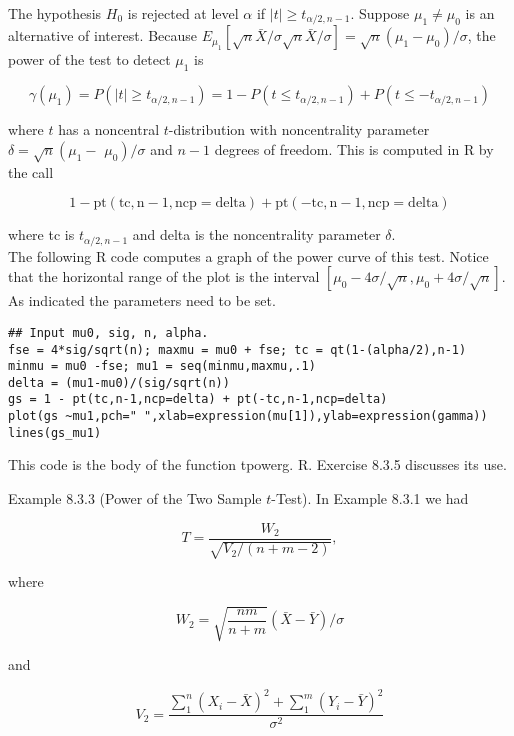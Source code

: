 The hypothesis $H_{0}$ is rejected at level $\alpha$ if $|t| \geq t_{\alpha / 2, n-1}$. Suppose $\mu_{1} \neq \mu_{0}$ is an alternative of interest. Because $E_{\mu_{1}}[\sqrt{n} \bar{X} / \sigma \sqrt{n} \bar{X} / \sigma]=\sqrt{n}\left(\mu_{1}-\mu_{0}\right) / \sigma$, the power of the test to detect $\mu_{1}$ is


\begin{equation*}
\gamma\left(\mu_{1}\right)=P\left(|t| \geq t_{\alpha / 2, n-1}\right)=1-P\left(t \leq t_{\alpha / 2, n-1}\right)+P\left(t \leq-t_{\alpha / 2, n-1}\right) \tag{8.3.5}
\end{equation*}


where $t$ has a noncentral $t$-distribution with noncentrality parameter $\delta=\sqrt{n}\left(\mu_{1}-\right.$ $\left.\mu_{0}\right) / \sigma$ and $n-1$ degrees of freedom. This is computed in R by the call

$$
1-\mathrm{pt}(\mathrm{tc}, \mathrm{n}-1, \mathrm{ncp}=\mathrm{delta})+\mathrm{pt}(-\mathrm{tc}, \mathrm{n}-1, \mathrm{ncp}=\mathrm{delta})
$$

where tc is $t_{\alpha / 2, n-1}$ and delta is the noncentrality parameter $\delta$.\\
The following R code computes a graph of the power curve of this test. Notice that the horizontal range of the plot is the interval $\left[\mu_{0}-4 \sigma / \sqrt{n}, \mu_{0}+4 \sigma / \sqrt{n}\right]$. As indicated the parameters need to be set.

\begin{verbatim}
## Input mu0, sig, n, alpha.
fse = 4*sig/sqrt(n); maxmu = mu0 + fse; tc = qt(1-(alpha/2),n-1)
minmu = mu0 -fse; mu1 = seq(minmu,maxmu,.1)
delta = (mu1-mu0)/(sig/sqrt(n))
gs = 1 - pt(tc,n-1,ncp=delta) + pt(-tc,n-1,ncp=delta)
plot(gs ~mu1,pch=" ",xlab=expression(mu[1]),ylab=expression(gamma))
lines(gs_mu1)
\end{verbatim}

This code is the body of the function tpowerg. R. Exercise 8.3.5 discusses its use.

Example 8.3.3 (Power of the Two Sample $t$-Test). In Example 8.3.1 we had

$$
T=\frac{W_{2}}{\sqrt{V_{2} /(n+m-2)}},
$$

where

$$
W_{2}=\sqrt{\frac{n m}{n+m}}(\bar{X}-\bar{Y}) / \sigma
$$

and

$$
V_{2}=\frac{\sum_{1}^{n}\left(X_{i}-\bar{X}\right)^{2}+\sum_{1}^{m}\left(Y_{i}-\bar{Y}\right)^{2}}{\sigma^{2}}
$$

